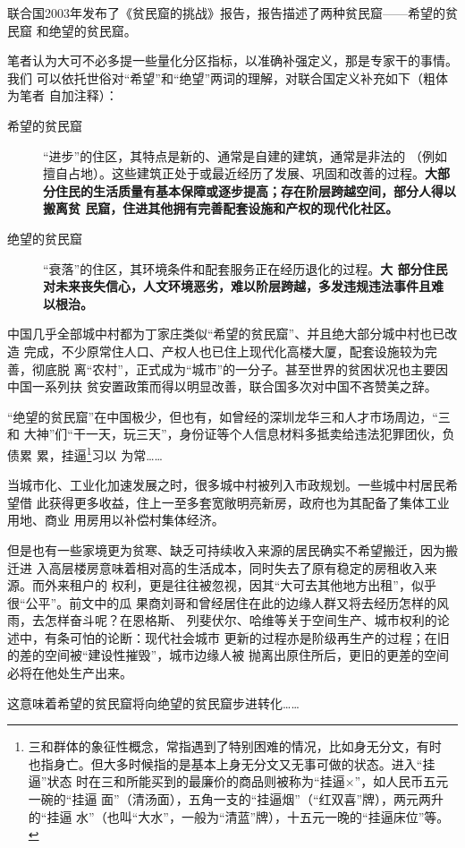 联合国2003年发布了《贫民窟的挑战》报告，报告描述了两种贫民窟——希望的贫民窟
和绝望的贫民窟。

笔者认为大可不必多提一些量化分区指标，以准确补强定义，那是专家干的事情。我们
可以依托世俗对“希望”和“绝望”两词的理解，对联合国定义补充如下（粗体为笔者
自加注释）：
\begin{description}
\item[希望的贫民窟] “进步”的住区，其特点是新的、通常是自建的建筑，通常是非法的
  （例如擅自占地）。这些建筑正处于或最近经历了发展、巩固和改善的过程。\textbf{大部
    分住民的生活质量有基本保障或逐步提高；存在阶层跨越空间，部分人得以搬离贫
    民窟，住进其他拥有完善配套设施和产权的现代化社区。}
\item[绝望的贫民窟] “衰落”的住区，其环境条件和配套服务正在经历退化的过程。\textbf{大
    部分住民对未来丧失信心，人文环境恶劣，难以阶层跨越，多发违规违法事件且难
    以根治。}
\end{description}

中国几乎全部城中村都为丁家庄类似“希望的贫民窟”、并且绝大部分城中村也已改造
完成，不少原常住人口、产权人也已住上现代化高楼大厦，配套设施较为完善，彻底脱
离“农村”，正式成为“城市”的一分子。甚至世界的贫困状况也主要因中国一系列扶
贫安置政策而得以明显改善，联合国多次对中国不吝赞美之辞。

“绝望的贫民窟”在中国极少，但也有，如曾经的深圳龙华三和人才市场周边，“三和
大神”们“干一天，玩三天”，身份证等个人信息材料多抵卖给违法犯罪团伙，负债累
累，挂逼\footnote{三和群体的象征性概念，常指遇到了特别困难的情况，比如身无分文，有时
  也指身亡。但大多时候指的是基本上身无分文又无事可做的状态。进入“挂逼”状态
  时在三和所能买到的最廉价的商品则被称为“挂逼×”，如人民币五元一碗的“挂逼
  面”（清汤面），五角一支的“挂逼烟”（“红双喜”牌），两元两升的“挂逼
  水”（也叫“大水”，一般为“清蓝”牌），十五元一晚的“挂逼床位”等。}习以
为常……


当城市化、工业化加速发展之时，很多城中村被列入市政规划。一些城中村居民希望借
此获得更多收益，住上一至多套宽敞明亮新房，政府也为其配备了集体工业用地、商业
用房用以补偿村集体经济。


但是也有一些家境更为贫寒、缺乏可持续收入来源的居民确实不希望搬迁，因为搬迁进
入高层楼房意味着相对高的生活成本，同时失去了原有稳定的房租收入来源。而外来租户的
权利，更是往往被忽视，因其“大可去其他地方出租”，似乎很“公平”。前文中的瓜
果商刘哥和曾经居住在此的边缘人群又将去经历怎样的风雨，去怎样奋斗呢？在恩格斯、
列斐伏尔、哈维等关于空间生产、城市权利的论述中，有条可怕的论断：现代社会城市
更新的过程亦是阶级再生产的过程；在旧的差的空间被“建设性摧毁”，城市边缘人被
抛离出原住所后，更旧的更差的空间必将在他处生产出来。

这意味着希望的贫民窟将向绝望的贫民窟步进转化……


